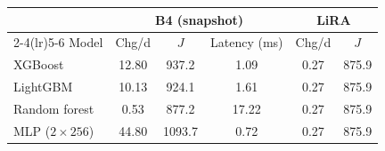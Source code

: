\begin{tabular}{@{}lccccc@{}}
\toprule
 & \multicolumn{3}{c}{B4 (snapshot)} & \multicolumn{2}{c}{LiRA} \\
\cmidrule(lr){2-4}\cmidrule(lr){5-6}
Model & Chg/d & $J$ & Latency (ms) & Chg/d & $J$ \\
\midrule
XGBoost & 12.80 & 937.2 & 1.09 & 0.27 & 875.9 \\
LightGBM & 10.13 & 924.1 & 1.61 & 0.27 & 875.9 \\
Random forest & 0.53 & 877.2 & 17.22 & 0.27 & 875.9 \\
MLP ($2\times256$) & 44.80 & 1093.7 & 0.72 & 0.27 & 875.9 \\
\bottomrule
\end{tabular}
